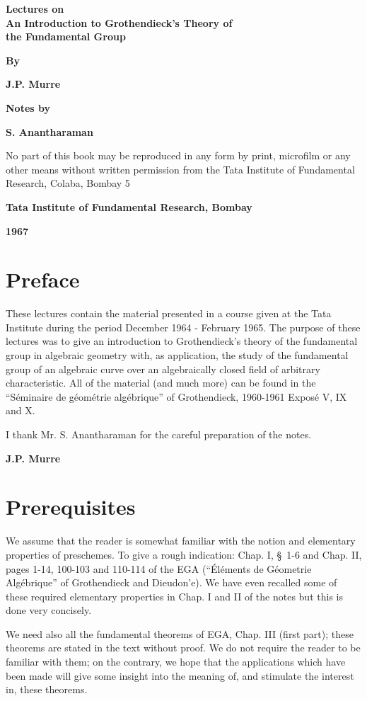 \thispagestyle{empty}
\begin{center}
{\Large\bf Lectures on}\\[5pt] 
{\Large\bf An Introduction to Grothendieck's Theory of}\\[5pt]
{\Large\bf the Fundamental Group}
\vskip 1cm

{\bf By}

{\large\bf J.P. Murre}
\vfill

{\bf Notes by}

{\large\bf S. Anantharaman}
\vfill

\parbox{0.7\textwidth}{No part of this book may be reproduced
in any form by print, microfilm or any other means without written permission
from the Tata Institute of Fundamental Research, Colaba, Bombay 5}
\vfill

{\bf Tata Institute of Fundamental Research, Bombay}

{\bf 1967}
\end{center}
\eject

\thispagestyle{empty}


\chapter{Preface}


These lectures contain the material presented in a course given at the
Tata Institute during the period December 1964 - February 1965. The
purpose of these lectures was to give an introduction to
Grothendieck's theory of the fundamental group in algebraic geometry
with, as application, the study of the fundamental group of an
algebraic curve over an algebraically closed field of arbitrary
characteristic. All of the material (and much more) can be found in
the ``S\'eminaire de g\'eom\'etrie alg\'ebrique'' of Grothendieck,
1960-1961 Expos\'e V, IX and X.

I thank Mr. S. Anantharaman for the careful preparation of the notes.


\bigskip

\hfill{{\large\bf J.P. Murre}}



\chapter{Prerequisites}


We assume that the reader is somewhat familiar with the notion and
elementary properties of preschemes. To give a rough indication:
Chap. I, \S\ 1-6 and Chap. II, pages 1-14, 100-103 and 110-114 of the
EGA (``\'El\'ements de G\'eometrie Alg\'ebrique'' of Grothendieck and
Dieudon'e). We have even recalled some of these required elementary
properties in Chap. I and II of the notes but this is done very
concisely.

We need also all the fundamental theorems of EGA, Chap. III (first
part); these theorems are stated in the text without proof. We do not
require the reader to be familiar with them; on the contrary, we hope
that the applications which have been made will give some insight into
the meaning of, and stimulate the interest in, these theorems.



